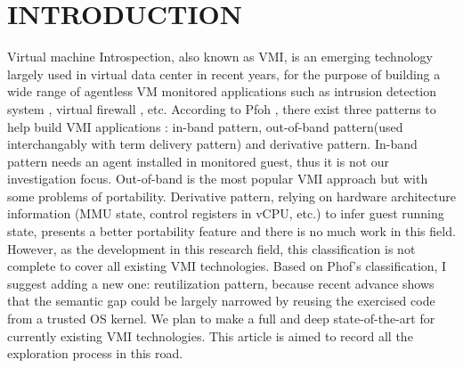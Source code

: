 
\chapter{INTRODUCTION} %

\label{Chapter1} %



Virtual machine Introspection, also known as VMI, is an emerging technology largely used in virtual data center in recent years, 
for the purpose of building a wide range of agentless VM monitored applications such as intrusion detection system \cite{Reference1}, 
virtual firewall \cite{Reference2}, etc. According to Pfoh \cite{Reference5}, there exist three patterns to help build VMI applications
: in-band pattern, out-of-band pattern(used interchangably with term delivery pattern) and derivative pattern. In-band pattern needs an
agent installed in monitored guest, thus it is not our investigation focus. Out-of-band is the most popular VMI approach but with some 
problems of portability. Derivative pattern, relying on hardware architecture information (MMU state, control registers in vCPU, etc.) 
to infer guest running state, presents a better portability feature and there is no much work in this field. However, as the development
in this research field, this classification is not complete to cover all existing VMI technologies. Based on Phof's classification,
I suggest adding a new one: reutilization pattern, because recent advance shows that the semantic gap could be largely narrowed by 
reusing the exercised code from a trusted OS kernel. We plan to make a full and deep state-of-the-art for currently existing VMI 
technologies. This article is aimed to record all the exploration process in this road.
